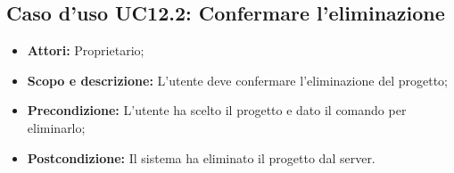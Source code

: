 \subsection{Caso d'uso UC12.2: Confermare l'eliminazione}
\begin{itemize}
	\item \textbf{Attori:} Proprietario;
	\item \textbf{Scopo e descrizione:} L'utente deve confermare l'eliminazione del progetto;
	\item \textbf{Precondizione:} L'utente ha scelto il progetto e dato il comando per eliminarlo;
	\item \textbf{Postcondizione:} Il sistema ha eliminato il progetto dal server.
\end{itemize}

